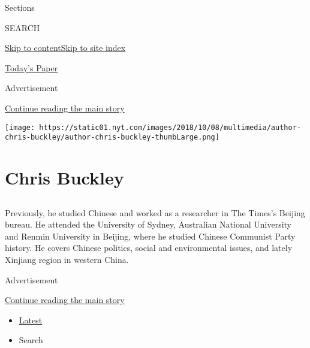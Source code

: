 Sections

SEARCH

\protect\hyperlink{site-content}{Skip to
content}\protect\hyperlink{site-index}{Skip to site index}

\href{https://myaccount.nytimes.com/auth/login?response_type=cookie\&client_id=vi}{}

\href{https://www.nytimes.com/section/todayspaper}{Today's Paper}

Advertisement

\protect\hyperlink{after-top}{Continue reading the main story}

\texttt{[image: https://static01.nyt.com/images/2018/10/08/multimedia/author-chris-buckley/author-chris-buckley-thumbLarge.png]}

\hypertarget{chris-buckley}{%
\section{Chris Buckley}\label{chris-buckley}}

\subsection{}

Previously, he studied Chinese and worked as a researcher in The Times's
Beijing bureau. He attended the University of Sydney, Australian
National University and Renmin University in Beijing, where he studied
Chinese Communist Party history. He covers Chinese politics, social and
environmental issues, and lately Xinjiang region in western China.

Advertisement

\protect\hyperlink{after-mid1}{Continue reading the main story}

\begin{itemize}
\tightlist
\item
  \protect\hyperlink{stream-panel}{Latest}
\item
  Search
\end{itemize}

